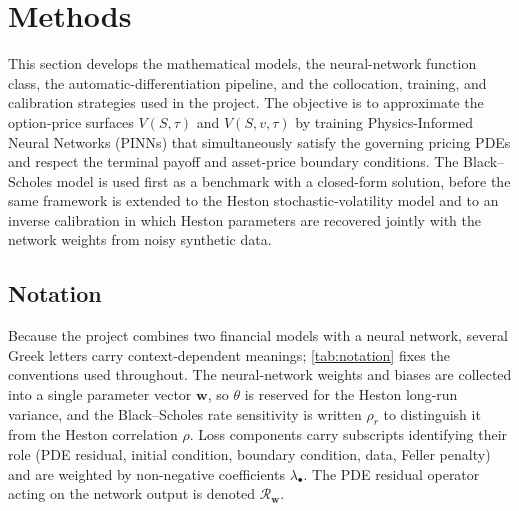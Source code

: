 \section{Methods}\label{section:methods}

This section develops the mathematical models, the neural-network function class, the automatic-differentiation pipeline, and the collocation, training, and calibration strategies used in the project. The objective is to approximate the option-price surfaces $V(S,\tau)$ and $V(S,v,\tau)$ by training Physics-Informed Neural Networks (PINNs) \parencite{raissi2019physics,karniadakis2021physics,cuomo2022scientific} that simultaneously satisfy the governing pricing PDEs and respect the terminal payoff and asset-price boundary conditions. The Black--Scholes model \parencite{black1973pricing,merton1973rational} is used first as a benchmark with a closed-form solution, before the same framework is extended to the Heston stochastic-volatility model \parencite{heston1993closed} and to an inverse calibration in which Heston parameters are recovered jointly with the network weights from noisy synthetic data.

\subsection{Notation}\label{subsec:notation}

Because the project combines two financial models with a neural network, several Greek letters carry context-dependent meanings; \cref{tab:notation} fixes the conventions used throughout. The neural-network weights and biases are collected into a single parameter vector $\boldsymbol{w}$, so $\theta$ is reserved for the Heston long-run variance, and the Black--Scholes rate sensitivity is written $\rho_r$ to distinguish it from the Heston correlation $\rho$. Loss components carry subscripts identifying their role (PDE residual, initial condition, boundary condition, data, Feller penalty) and are weighted by non-negative coefficients $\lambda_{\bullet}$. The PDE residual operator acting on the network output is denoted $\mathcal{R}_{\boldsymbol{w}}$.

